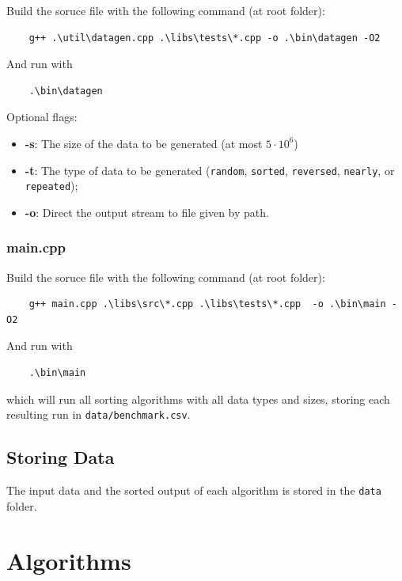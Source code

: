\documentclass{article}
\begin{document}
Build the soruce file with the following command (at root folder):

\begin{verbatim}
    g++ .\util\datagen.cpp .\libs\tests\*.cpp -o .\bin\datagen -O2
\end{verbatim}


And run with

\begin{verbatim}
    .\bin\datagen
\end{verbatim}


Optional flags:

\begin{itemize}
	\item \textbf{-s}: The size of the data to be generated (at most $5\cdot10^6$)
	\item \textbf{-t}: The type of data to be generated (\texttt{random}, \texttt{sorted}, \texttt{reversed}, \texttt{nearly}, or \texttt{repeated});
	\item \textbf{-o}: Direct the output stream to file given by path.
\end{itemize}


\subsubsection*{main.cpp}

Build the soruce file with the following command (at root folder):

\begin{verbatim}
    g++ main.cpp .\libs\src\*.cpp .\libs\tests\*.cpp  -o .\bin\main -O2
\end{verbatim}


And run with

\begin{verbatim}
    .\bin\main
\end{verbatim}

which will run all sorting algorithms with all data types and sizes, storing each resulting run in \texttt{data/benchmark.csv}.

\subsection{Storing Data}

The input data and the sorted output of each algorithm is stored in the \texttt{data} folder.


\section{Algorithms}
\end{document}
